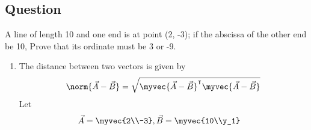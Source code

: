 \documentclass[journal,12pt,twocolumn]{IEEEtran}
\renewcommand\thesection{\arabic{section}}
\renewcommand\thesubsection{\thesection.\arabic{subsection}}
\renewcommand\thesubsubsection{\thesubsection.\arabic{subsubsection}}
\begin{document}
\subsection{Question}
A line of length 10 and one end is at point (2, -3); if the abscissa of the other end be 10, Prove that its ordinate must be 3 or -9.
\begin{enumerate}
\begin{align}
\myvec{2\\-3}, \myvec{10\\y_1} \label{eq:1}
\end{align}
\subsection{Solution}
\item
The distance between two vectors is given by 
\begin{align}
\norm{\vec{A}-\vec{B}}=\sqrt{\myvec{\vec{A}-\vec{B}}^\intercal \myvec{\vec{A}-\vec{B}}} \label{eq:1.1}
\end{align}
Let
\begin{align}
\vec{A}&=\myvec{2\\-3}, \vec{B}=\myvec{10\\y_1} \nonumber    
\end{align}


\end{enumerate}
\end{document}
